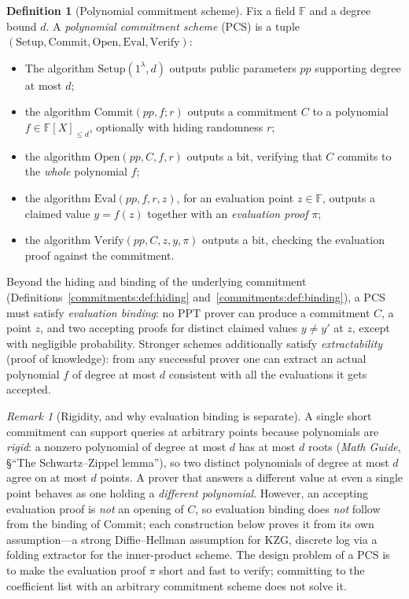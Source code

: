 \documentclass[11pt,a4paper]{article}
\theoremstyle{definition}
\newtheorem{definition}[theorem]{Definition}
\theoremstyle{remark}
\newtheorem{remark}[theorem]{Remark}
\newcommand{\F}{\ensuremath{\mathbb{F}}}
\begin{document}
\begin{definition}[Polynomial commitment scheme]
\label{commitments:def:pcs}
Fix a field \(\F\) and a degree bound \(d\). A \emph{polynomial
commitment scheme} (PCS) is a tuple
\((\mathrm{Setup}, \mathrm{Commit}, \mathrm{Open}, \mathrm{Eval},
\mathrm{Verify})\):
\begin{itemize}
\item The algorithm \(\mathrm{Setup}(1^\lambda, d)\) outputs public
  parameters \(pp\) supporting degree at most \(d\);
\item the algorithm \(\mathrm{Commit}(pp, f; r)\) outputs a
  commitment \(C\) to a polynomial \(f \in \F[X]_{\le d}\),
  optionally with hiding randomness \(r\);
\item the algorithm \(\mathrm{Open}(pp, C, f, r)\) outputs a bit,
  verifying that \(C\) commits to the \emph{whole} polynomial \(f\);
\item the algorithm \(\mathrm{Eval}(pp, f, r, z)\), for an
  evaluation point \(z \in \F\), outputs a claimed value
  \(y = f(z)\) together with an \emph{evaluation proof} \(\pi\);
\item the algorithm \(\mathrm{Verify}(pp, C, z, y, \pi)\) outputs a
  bit, checking the evaluation proof against the commitment.
\end{itemize}
Beyond the hiding and binding of the underlying commitment
(Definitions~\ref{commitments:def:hiding}
and~\ref{commitments:def:binding}), a PCS must satisfy
\emph{evaluation binding}: no PPT prover can produce a commitment
\(C\), a point \(z\), and two accepting proofs for distinct claimed
values \(y \ne y'\) at \(z\), except with negligible probability.
Stronger schemes additionally satisfy \emph{extractability} (proof
of knowledge): from any successful prover one can extract an actual
polynomial \(f\) of degree at most \(d\) consistent with all the
evaluations it gets accepted.
\end{definition}

\begin{remark}[Rigidity, and why evaluation binding is separate]
\label{commitments:rem:rigidity}
A single short commitment can support queries at arbitrary points
because polynomials are \emph{rigid}: a nonzero polynomial of degree
at most \(d\) has at most \(d\) roots (\emph{Math Guide}, \S``The
Schwartz--Zippel lemma''), so two distinct polynomials of degree at
most \(d\) agree on at most \(d\) points. A prover that answers a
different value at even a single point behaves as one holding a
\emph{different polynomial}. However, an accepting evaluation proof is
\emph{not} an opening of \(C\), so evaluation binding does \emph{not}
follow from the binding of \(\mathrm{Commit}\); each construction below
proves it from its own assumption---a strong Diffie--Hellman assumption
for KZG, discrete log via a folding extractor for the inner-product
scheme. The design problem of a PCS is to make the evaluation proof
\(\pi\) short and fast to verify; committing to the coefficient list with an
arbitrary commitment scheme does not solve it.
\end{remark}
\end{document}
